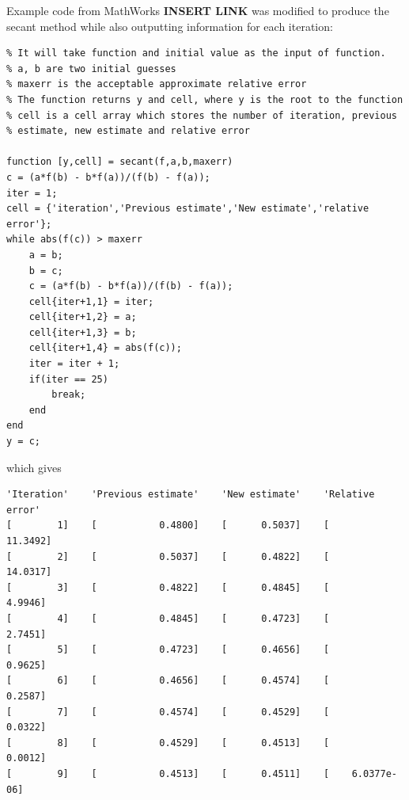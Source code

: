\documentclass{article}
\begin{document}
Example code from MathWorks \textbf{INSERT LINK} was modified to produce the secant method while also outputting information for each iteration:

\begin{lstlisting}
% It will take function and initial value as the input of function. 
% a, b are two initial guesses
% maxerr is the acceptable approximate relative error
% The function returns y and cell, where y is the root to the function
% cell is a cell array which stores the number of iteration, previous
% estimate, new estimate and relative error

function [y,cell] = secant(f,a,b,maxerr)
c = (a*f(b) - b*f(a))/(f(b) - f(a));
iter = 1;       
cell = {'iteration','Previous estimate','New estimate','relative error'};
while abs(f(c)) > maxerr
    a = b;
    b = c;
    c = (a*f(b) - b*f(a))/(f(b) - f(a));
    cell{iter+1,1} = iter;
    cell{iter+1,2} = a;
    cell{iter+1,3} = b;
    cell{iter+1,4} = abs(f(c));
    iter = iter + 1;
    if(iter == 25)
        break;
    end
end
y = c;
\end{lstlisting}

\hspace{20pt}

\noindent which gives

\begin{lstlisting}
'Iteration'    'Previous estimate'    'New estimate'    'Relative error'
[        1]    [           0.4800]    [      0.5037]    [       11.3492]
[        2]    [           0.5037]    [      0.4822]    [       14.0317]
[        3]    [           0.4822]    [      0.4845]    [        4.9946]
[        4]    [           0.4845]    [      0.4723]    [        2.7451]
[        5]    [           0.4723]    [      0.4656]    [        0.9625]
[        6]    [           0.4656]    [      0.4574]    [        0.2587]
[        7]    [           0.4574]    [      0.4529]    [        0.0322]
[        8]    [           0.4529]    [      0.4513]    [        0.0012]
[        9]    [           0.4513]    [      0.4511]    [    6.0377e-06]
\end{lstlisting}
\end{document}

